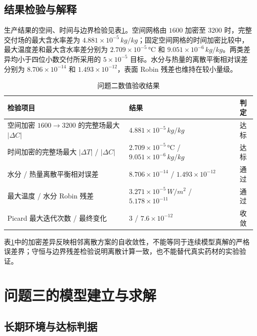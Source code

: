 \documentclass[withoutpreface,bwprint]{cumcmthesis}
\begin{document}
\subsection{结果检验与解释}

生产结果的空间、时间与边界检验见表\ref{tab:p2_verification}。空间网格由 $1600$ 加密至 $3200$ 时，完整交付场的最大含水率差为 $4.881\times10^{-5}\,\si{kg/kg}$；固定空间网格的时间加密比较中，最大温度差和最大含水率差分别为 $2.709\times10^{-5}\,\si{\celsius}$ 和 $9.051\times10^{-6}\,\si{kg/kg}$。两类差异均小于四位小数交付所采用的 $5\times10^{-5}$ 目标。水分与热量的离散平衡相对误差分别为 $8.706\times10^{-14}$ 和 $1.493\times10^{-12}$，表面 Robin 残差也维持在较小量级。

\begin{table}[H]
\centering
\caption{问题二数值验收结果}
\label{tab:p2_verification}
\begin{tabular}{p{}p{}c}
\toprule[1.2pt]
检验项目 & 结果 & 判定\\
\midrule
空间加密 $1600\rightarrow3200$ 的完整场最大 $|\Delta C|$ & $4.881\times10^{-5}\,\si{kg/kg}$ & 达标\\
时间加密的完整场最大 $|\Delta T|$ / $|\Delta C|$ & $2.709\times10^{-5}\,\si{\celsius}$ / $9.051\times10^{-6}\,\si{kg/kg}$ & 达标\\
水分 / 热量离散平衡相对误差 & $8.706\times10^{-14}$ / $1.493\times10^{-12}$ & 通过\\
最大温度 / 水分 Robin 残差 & $3.271\times10^{-5}\,\si{W/m^2}$ / $5.178\times10^{-11}$ & 通过\\
Picard 最大迭代次数 / 最终变化 & $3$ / $7.6\times10^{-12}$ & 收敛\\
\bottomrule[1.2pt]
\end{tabular}
\end{table}

表\ref{tab:p2_verification}中的加密差异反映相邻离散方案的自收敛性，不能等同于连续模型真解的严格误差界；守恒与边界残差检验说明离散计算一致，也不能替代真实药材的实验验证。

\section{问题三的模型建立与求解}

\subsection{长期环境与达标判据}
\end{document}
